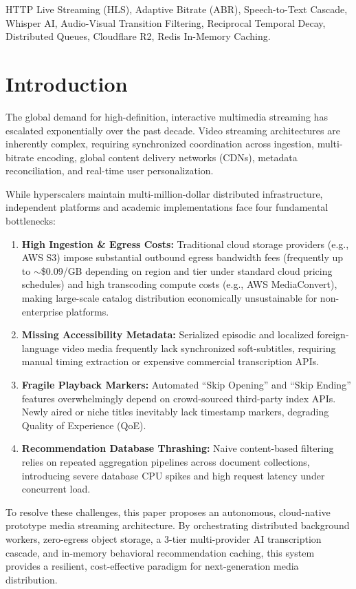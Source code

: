 \documentclass[conference]{IEEEtran}
\begin{document}
\begin{IEEEkeywords}
HTTP Live Streaming (HLS), Adaptive Bitrate (ABR), Speech-to-Text Cascade, Whisper AI, Audio-Visual Transition Filtering, Reciprocal Temporal Decay, Distributed Queues, Cloudflare R2, Redis In-Memory Caching.
\end{IEEEkeywords}

\section{Introduction}
The global demand for high-definition, interactive multimedia streaming has escalated exponentially over the past decade. Video streaming architectures are inherently complex, requiring synchronized coordination across ingestion, multi-bitrate encoding, global content delivery networks (CDNs), metadata reconciliation, and real-time user personalization.

While hyperscalers maintain multi-million-dollar distributed infrastructure, independent platforms and academic implementations face four fundamental bottlenecks:
\begin{enumerate}
    \item \textbf{High Ingestion \& Egress Costs:} Traditional cloud storage providers (e.g., AWS S3) impose substantial outbound egress bandwidth fees (frequently up to $\sim$\$0.09/GB depending on region and tier under standard cloud pricing schedules) and high transcoding compute costs (e.g., AWS MediaConvert), making large-scale catalog distribution economically unsustainable for non-enterprise platforms.
    \item \textbf{Missing Accessibility Metadata:} Serialized episodic and localized foreign-language video media frequently lack synchronized soft-subtitles, requiring manual timing extraction or expensive commercial transcription APIs.
    \item \textbf{Fragile Playback Markers:} Automated ``Skip Opening'' and ``Skip Ending'' features overwhelmingly depend on crowd-sourced third-party index APIs. Newly aired or niche titles inevitably lack timestamp markers, degrading Quality of Experience (QoE).
    \item \textbf{Recommendation Database Thrashing:} Naive content-based filtering relies on repeated aggregation pipelines across document collections, introducing severe database CPU spikes and high request latency under concurrent load.
\end{enumerate}

To resolve these challenges, this paper proposes an autonomous, cloud-native prototype media streaming architecture. By orchestrating distributed background workers, zero-egress object storage, a 3-tier multi-provider AI transcription cascade, and in-memory behavioral recommendation caching, this system provides a resilient, cost-effective paradigm for next-generation media distribution.
\end{document}
